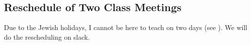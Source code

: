 \subsection*{Reschedule of Two Class Meetings}

Due to the Jewish holidays, I cannot be here to teach on two days (see \coursewebpagelink). We will do the rescheduling on slack.